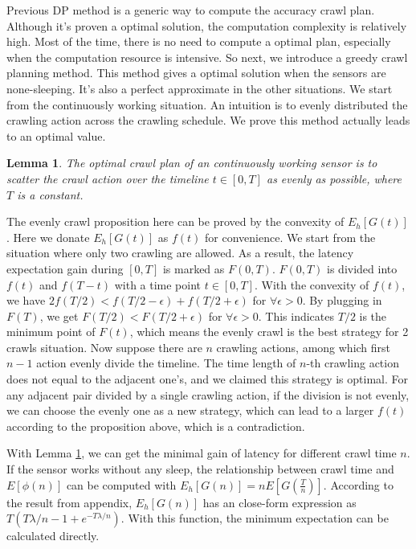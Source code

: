\documentclass[conference]{IEEEtran}
\newtheorem{lemma}{Lemma}
\begin{document}
Previous DP method is a generic way to compute the accuracy crawl plan. 
Although it's proven a optimal solution, the computation complexity is relatively high.
Most of the time, there is no need to compute a optimal plan, especially when the computation resource is intensive.
So next, we introduce a greedy crawl planning method.
This method gives a optimal solution when the sensors are none-sleeping. 
It's also a perfect approximate in the other situations.
We start from the continuously working situation. 
An intuition is to evenly distributed the crawling action across the crawling schedule. 
We prove this method actually leads to an optimal value.
\begin{lemma}
\label{evenly}
The optimal crawl plan of an continuously working sensor is to scatter the crawl action over the timeline $t\in [0, T]$ as evenly as possible, where $T$ is a constant.
\end{lemma}
\begin{IEEEproof}
The evenly crawl proposition here can be proved by the convexity of $E_h[G(t)]$ \cite{boyd2004convex}. 
Here we donate $E_h[G(t)]$ as $f(t)$ for convenience. 
We start from the situation where only two crawling are allowed. 
As a result, the latency expectation gain during $[0,T]$ is marked as $F(0, T)$.
$F(0,T)$ is divided into $f(t)$ and $f(T-t)$ with a time point $t\in[0,T]$. 
With the convexity of $f(t)$, we have $2f(T/2)<f(T/2-\epsilon)+f(T/2+\epsilon)$ for $\forall{\epsilon>0}$. 
By plugging in $F(T)$, we get $F(T/2)<F(T/2+\epsilon)$ for $\forall{\epsilon>0}$.
This indicates $T/2$ is the minimum point of $F(t)$, which means the evenly crawl is the best strategy for 2 crawls situation.
Now suppose there are $n$ crawling actions, among which first $n-1$ action evenly divide the timeline. The time length of $n$-th crawling action does not equal to the adjacent one's, and we claimed this strategy is optimal. For any adjacent pair divided by a single crawling action, if the division is not evenly, we can choose the evenly one as a new strategy, which can lead to a larger $f(t)$ according to the proposition above, which is a contradiction.
\end{IEEEproof}

With Lemma \ref{evenly}, we can get the minimal gain of latency for different crawl time $n$.
If the sensor works without any sleep, the relationship between crawl time and $E[\phi(n)]$ can be computed with $E_h[G(n)]=nE[G(\frac{T}{n})]$.
According to the result from appendix, $E_h[G(n)]$ has an close-form expression as $T(T\lambda/n-1+e^{-T\lambda/n})$. 
With this function, the minimum expectation can be calculated directly.
\end{document}
